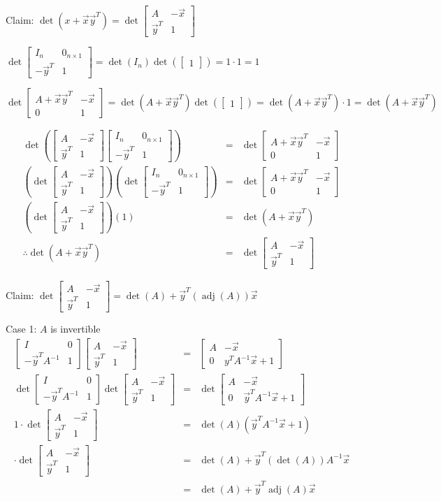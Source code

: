 \documentclass[letterpaper,12pt,fleqn]{article}
\DeclareMathOperator{\adj}{adj}
\newcommand{\vx}{\vec{x}}
\newcommand{\vy}{\vec{y}}
\begin{document}
\begin{theproof}
  \newcommand{\mm}{\begin{bmatrix}
      A & -\vx \\ \vy^T & 1
  \end{bmatrix}}
  \newcommand{\mn}{\begin{bmatrix}
      I_n & 0_{n\times 1} \\ -\vy^T & 1
  \end{bmatrix}}
  \newcommand{\mo}{\begin{bmatrix}
      A+\vx\vy^T & -\vx \\ 0 & 1
  \end{bmatrix}}

  Claim: $\det(x+\vx\vy^T)=\det\mm$

  $\det\mn=\det(I_n)\det(\begin{bmatrix} 1 \end{bmatrix})=1\cdot1=1$

  $\det\mo=\det(A+\vx\vy^T)\det(\begin{bmatrix} 1 \end{bmatrix})=
  \det(A+\vx\vy^T)\cdot1=\det(A+\vx\vy^T)$

  \begin{eqnarray*}
    \det\left(\mm\mn\right) &=& \det\mo \\
    \left(\det\mm\right)\left(\det\mn\right) &=& \det\mo \\
    \left(\det\mm\right)(1) &=& \det(A+\vx\vy^T) \\
    \therefore \det(A+\vx\vy^T) &=& \det\mm
  \end{eqnarray*}

  Claim: $\det\mm=\det(A)+\vy^T(\adj(A))\vx$

  \begin{description}
  \item Case 1: $A$ is invertible
    \begin{eqnarray*}
      \begin{bmatrix} I & 0 \\ -\vy^TA^{-1} & 1 \end{bmatrix}\mm &=&
      \begin{bmatrix} A & -\vx \\ 0 & y^TA^{-1}\vx+1 \end{bmatrix} \\
      \det\begin{bmatrix} I & 0 \\ -\vy^TA^{-1} & 1 \end{bmatrix}\det\mm &=&
      \det\begin{bmatrix} A & -\vx \\ 0 & \vy^TA^{-1}\vx+1 \end{bmatrix} \\
      1\cdot\det\mm &=& \det(A)(\vy^TA^{-1}\vx+1) \\
      \cdot\det\mm &=& \det(A)+\vy^T(\det(A))A^{-1}\vx \\
      &=& \det(A)+\vy^T\adj(A)\vx
    \end{eqnarray*}


\end{description}
\end{theproof}
\end{document}
